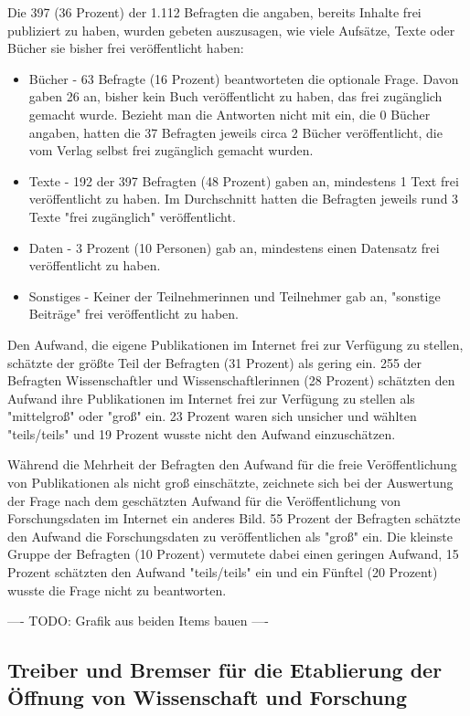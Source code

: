 Die 397 (36 Prozent) der 1.112 Befragten die angaben, bereits Inhalte frei publiziert zu haben, wurden gebeten auszusagen, wie viele Aufsätze, Texte oder Bücher sie bisher frei veröffentlicht haben:
\begin{itemize}
\item Bücher - 63 Befragte (16 Prozent) beantworteten die optionale Frage. Davon gaben 26 an, bisher kein Buch veröffentlicht zu haben, das frei zugänglich gemacht wurde. Bezieht man die Antworten nicht mit ein, die 0 Bücher angaben, hatten die 37 Befragten jeweils circa 2 Bücher veröffentlicht, die vom Verlag selbst frei zugänglich gemacht wurden.
\item Texte - 192 der 397 Befragten (48 Prozent) gaben an, mindestens 1 Text frei veröffentlicht zu haben. Im Durchschnitt hatten die Befragten jeweils rund 3 Texte "frei zugänglich" veröffentlicht.
\item Daten - 3 Prozent (10 Personen) gab an, mindestens einen Datensatz frei veröffentlicht zu haben.
\item Sonstiges - Keiner der Teilnehmerinnen und Teilnehmer gab an, "sonstige Beiträge" frei veröffentlicht zu haben.
\end{itemize}

Den Aufwand, die eigene Publikationen im Internet frei zur Verfügung zu stellen, schätzte der größte Teil der Befragten (31 Prozent) als gering ein. 255 der Befragten Wissenschaftler und Wissenschaftlerinnen (28 Prozent) schätzten den Aufwand ihre Publikationen im Internet frei zur Verfügung zu stellen als "mittelgroß" oder "groß" ein. 23 Prozent waren sich unsicher und wählten "teils/teils" und 19 Prozent wusste nicht den Aufwand einzuschätzen.

Während die Mehrheit der Befragten den Aufwand für die freie Veröffentlichung von Publikationen als nicht groß einschätzte, zeichnete sich bei der Auswertung der Frage nach dem geschätzten Aufwand für die Veröffentlichung von Forschungsdaten im Internet ein anderes Bild. 55 Prozent der Befragten schätzte den Aufwand die Forschungsdaten zu veröffentlichen als "groß" ein. Die kleinste Gruppe der Befragten (10 Prozent) vermutete dabei einen geringen Aufwand, 15 Prozent schätzten den Aufwand "teils/teils" ein und ein Fünftel (20 Prozent) wusste die Frage nicht zu beantworten.

---- TODO: Grafik aus beiden Items bauen ----

\subsection{Treiber und Bremser für die Etablierung der Öffnung von Wissenschaft und Forschung}

